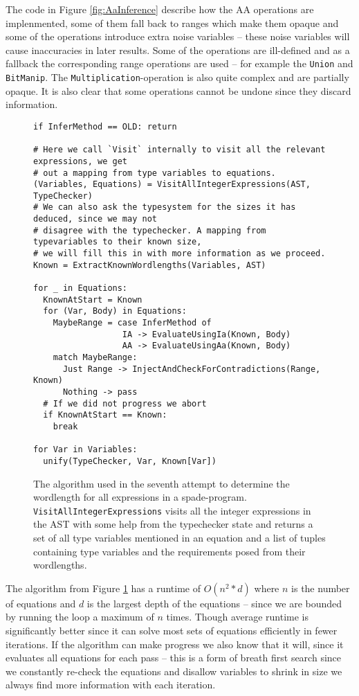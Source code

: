 The code in Figure \ref{fig:AaInference} describe how the AA operations are implenmented, some of them fall back to ranges which make them opaque and some of the operations introduce extra noise variables -- these noise variables will cause inaccuracies in later results. Some of the operations are ill-defined and as a fallback the corresponding range operations are used -- for example the \verb+Union+ and \verb+BitManip+. The \verb+Multiplication+-operation is also quite complex and are partially opaque. It is also clear that some operations cannot be undone since they discard information.

\begin{figure}
\begin{verbatim}
if InferMethod == OLD: return

# Here we call `Visit` internally to visit all the relevant expressions, we get
# out a mapping from type variables to equations.
(Variables, Equations) = VisitAllIntegerExpressions(AST, TypeChecker)
# We can also ask the typesystem for the sizes it has deduced, since we may not
# disagree with the typechecker. A mapping from typevariables to their known size,
# we will fill this in with more information as we proceed.
Known = ExtractKnownWordlengths(Variables, AST)

for _ in Equations:
  KnownAtStart = Known
  for (Var, Body) in Equations:
    MaybeRange = case InferMethod of
                  IA -> EvaluateUsingIa(Known, Body)
                  AA -> EvaluateUsingAa(Known, Body)
    match MaybeRange:
      Just Range -> InjectAndCheckForContradictions(Range, Known)
      Nothing -> pass
  # If we did not progress we abort
  if KnownAtStart == Known:
    break

for Var in Variables:
  unify(TypeChecker, Var, Known[Var])
\end{verbatim}
  \cprotect\caption{The algorithm used in the seventh attempt to determine the wordlength for all expressions in a spade-program. \verb+VisitAllIntegerExpressions+ visits all the integer expressions in the AST with some help from the typechecker state and returns a set of all type variables mentioned in an equation and a list of tuples containing type variables and the requirements posed from their wordlengths.}
\label{fig:WLIAlgo}
\end{figure}

The algorithm from Figure \ref{fig:WLIAlgo} has a runtime of $O(n^2*d)$ where $n$ is the number of equations and $d$ is the largest depth of the equations -- since we are bounded by running the loop a maximum of $n$ times. Though average runtime is significantly better since it can solve most sets of equations efficiently in fewer iterations. If the algorithm can make progress we also know that it will, since it evaluates all equations for each pass -- this is a form of breath first search since we constantly re-check the equations and disallow variables to shrink in size we always find more information with each iteration.


